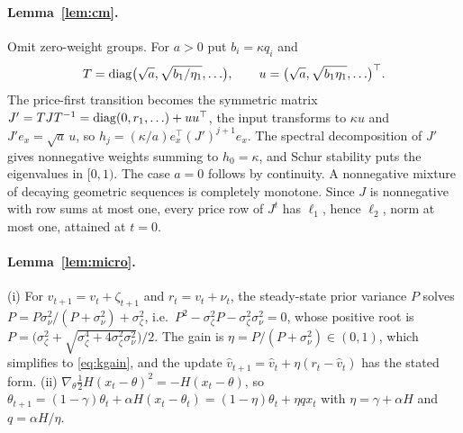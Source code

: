 \documentclass[12pt]{article}
\theoremstyle{definition}
\theoremstyle{remark}
\begin{document}
\paragraph{Lemma~\ref{lem:cm}.} Omit zero-weight groups. For $a>0$ put $b_i=\kappa q_i$ and
\[
T={\rm diag}\bigl(\sqrt a,\sqrt{b_1/\eta_1},\ldots\bigr),\qquad u=\bigl(\sqrt a,\sqrt{b_1\eta_1},\ldots\bigr)^\top .
\]
The price-first transition becomes the symmetric matrix $J'=TJT^{-1}={\rm diag}(0,r_1,\ldots)+uu^\top$, the input transforms to $\kappa u$ and $J'e_x=\sqrt a\,u$, so $h_j=(\kappa/a)e_x^\top(J')^{j+1}e_x$. The spectral decomposition of $J'$ gives nonnegative weights summing to $h_0=\kappa$, and Schur stability puts the eigenvalues in $[0,1)$. The case $a=0$ follows by continuity. A nonnegative mixture of decaying geometric sequences is completely monotone. Since $J$ is nonnegative with row sums at most one, every price row of $J^t$ has $\ell_1$, hence $\ell_2$, norm at most one, attained at $t=0$.


\paragraph{Lemma~\ref{lem:micro}.} (i) For $v_{t+1}=v_t+\zeta_{t+1}$ and $r_t=v_t+\nu_t$, the steady-state prior variance $P$ solves $P=P\sigma_\nu^2/(P+\sigma_\nu^2)+\sigma_\zeta^2$, i.e.\ $P^2-\sigma_\zeta^2P-\sigma_\zeta^2\sigma_\nu^2=0$, whose positive root is $P=\bigl(\sigma_\zeta^2+\sqrt{\sigma_\zeta^4+4\sigma_\zeta^2\sigma_\nu^2}\bigr)/2$. The gain is $\eta=P/(P+\sigma_\nu^2)\in(0,1)$, which simplifies to \eqref{eq:kgain}, and the update $\hat v_{t+1}=\hat v_t+\eta(r_t-\hat v_t)$ has the stated form. (ii) $\nabla_\theta\tfrac12H(x_t-\theta)^2=-H(x_t-\theta)$, so $\theta_{t+1}=(1-\gamma)\theta_t+\alpha H(x_t-\theta_t)=(1-\eta)\theta_t+\eta qx_t$ with $\eta=\gamma+\alpha H$ and $q=\alpha H/\eta$.
\end{document}
